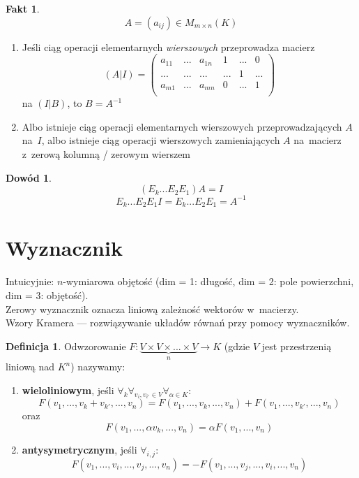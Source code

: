 \documentclass[12pt,a4paper]{article}
\theoremstyle{plain}
\theoremstyle{definition}
\newtheorem{ft}{Fakt}[section]
\theoremstyle{definition}
\newtheorem{df}{Definicja}[section]
\theoremstyle{definition}
\theoremstyle{definition}
\newtheorem*{dd}{Dowód}
\theoremstyle{definition}
\theoremstyle{definition}
\theoremstyle{definition}
\theoremstyle{definition}
\theoremstyle{definition}
\begin{document}
\begin{ft}
    \[A = (a_{ij}) \in M_{m\times n}(K)\]
  \begin{enumerate}
    \item Jeśli ciąg operacji elementarnych \textit{wierszowych} przeprowadza
      macierz \[(A|I)=\begin{pmatrix}
        a_{11}&...&a_{1n}& 1 &...& 0 \\
        ...&...&...&...& 1 &...\\
        a_{m1}&...&a_{mn}& 0 &...& 1 \\
      \end{pmatrix}\]
      na $(I|B)$, to $B = A^{-1}$
    \item Albo istnieje ciąg operacji elementarnych wierszowych
      przeprowadzających $A$ na~$I$, albo istnieje ciąg operacji
      wierszowych zamieniających $A$ na~macierz z~zerową kolumną /
      zerowym wierszem
  \end{enumerate}
\end{ft}

\begin{dd}
    \[(E_k...E_2E_1)A=I\]
  \[E_k...E_2E_1I=E_k...E_2E_1=A^{-1}\]
\end{dd}

\section{Wyznacznik}
    Intuicyjnie: $n$-wymiarowa objętość (dim = 1: długość, dim = 2: pole powierzchni, dim = 3: objętość). \\
    Zerowy wyznacznik oznacza liniową zależność wektorów w~macierzy. \\
    Wzory Kramera --- rozwiązywanie układów równań przy pomocy wyznaczników.

\begin{df}
    Odwzorowanie
  $F: \underbrace{V \times V \times ... \times V}_{n} \rightarrow K$
  (gdzie $V$ jest przestrzenią liniową nad $K^n$) nazywamy:
  \begin{enumerate}
    \item \textbf{wieloliniowym}, jeśli
      $\forall_k\forall_{v_i,v_{i'}\in V}\forall_{\alpha\in K}$:
      \[F(v_1, ..., v_k+v_{k'}, ..., v_n)
      = F(v_1, ..., v_k, ..., v_n) + F(v_1, ...,v_{k'}, ..., v_n)\]
      oraz
      \[F(v_1, ..., \alpha v_k, ..., v_n) = \alpha F(v_1, ..., v_n)\]
    \item \textbf{antysymetrycznym}, jeśli $\forall_{i,j}$:
      \[F(v_1, ..., v_i, ..., v_j, ..., v_n)
      = -F(v_1, ..., v_j, ..., v_i, ..., v_n)\]
  \end{enumerate}
\end{df}
\end{document}
